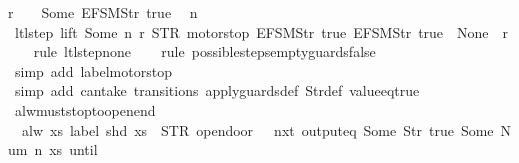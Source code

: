 \begin{isabellebody}
{\isachardoublequoteopen}r\ {\isachardollar}\ {}\ {\isasymnoteq}\ Some\ {\isacharparenleft}EFSM{\isachardot}Str\ {\isacharprime}{\isacharprime}true{\isacharprime}{\isacharprime}{\isacharparenright}\ {\isasymLongrightarrow}\isanewline
\ n\ {\isasymin}\ {\isacharbraceleft}{}{\isacharcomma}\ {}{\isacharcomma}\ {}{\isacharcomma}\ {}{\isacharbraceright}\ {\isasymLongrightarrow}\isanewline
\ ltl{\isacharunderscore}step\ lift\ {\isacharparenleft}Some\ n{\isacharparenright}\ r\ {\isacharparenleft}STR\ {\isacharprime}{\isacharprime}motorstop{\isacharprime}{\isacharprime}{\isacharcomma}\ {\isacharbrackleft}EFSM{\isachardot}Str\ {\isacharprime}{\isacharprime}true{\isacharprime}{\isacharprime}{\isacharcomma}\ EFSM{\isachardot}Str\ {\isacharprime}{\isacharprime}true{\isacharprime}{\isacharprime}{\isacharbrackright}{\isacharparenright}\ {\isacharequal}\ {\isacharparenleft}None{\isacharcomma}\ {\isacharbrackleft}{\isacharbrackright}{\isacharcomma}\ r{\isacharparenright}{\isachardoublequoteclose}\isanewline
%
\isadelimproof
\ \ %
\endisadelimproof
%
\isatagproof
{}\isamarkupfalse%
\ {\isacharparenleft}rule\ ltl{\isacharunderscore}step{\isacharunderscore}none{\isacharparenright}\isanewline
\ \ \isamarkupfalse%
\ {\isacharparenleft}rule\ possible{\isacharunderscore}steps{\isacharunderscore}empty{\isacharunderscore}guards{\isacharunderscore}false{\isacharparenright}\isanewline
\ \ \isamarkupfalse%
\ {\isacharparenleft}simp\ add{\isacharcolon}\ label{\isacharunderscore}motorstop{\isacharparenright}\isanewline
\ \ \isamarkupfalse%
\ {\isacharparenleft}simp\ add{\isacharcolon}\ can{\isacharunderscore}take\ transitions\ apply{\isacharunderscore}guards{\isacharunderscore}def\ Str{\isacharunderscore}def\ value{\isacharunderscore}eq{\isacharunderscore}true{\isacharparenright}%
\endisatagproof
{\isafoldproof}%
%
\isadelimproof
\isanewline
%
\endisadelimproof
\isanewline
{}\isamarkupfalse%
\ alw{\isacharunderscore}must{\isacharunderscore}stop{\isacharunderscore}to{\isacharunderscore}open{\isacharunderscore}end{\isacharcolon}\isanewline
\ \ {\isachardoublequoteopen}alw\ {\isacharparenleft}{\isacharparenleft}{\isasymlambda}xs{\isachardot}\ label\ {\isacharparenleft}shd\ xs{\isacharparenright}\ {\isacharequal}\ STR\ {\isacharprime}{\isacharprime}opendoor{\isacharprime}{\isacharprime}\ {\isasymlongrightarrow}\ {\isasymnot}\ nxt\ {\isacharparenleft}output{\isacharunderscore}eq\ {\isacharbrackleft}Some\ {\isacharparenleft}Str\ {\isacharprime}{\isacharprime}true{\isacharprime}{\isacharprime}{\isacharparenright}{\isacharcomma}\ Some\ {\isacharparenleft}Num\ n{\isacharparenright}{\isacharbrackright}{\isacharparenright}\ xs{\isacharparenright}\ until\isanewline

\end{isabellebody}
